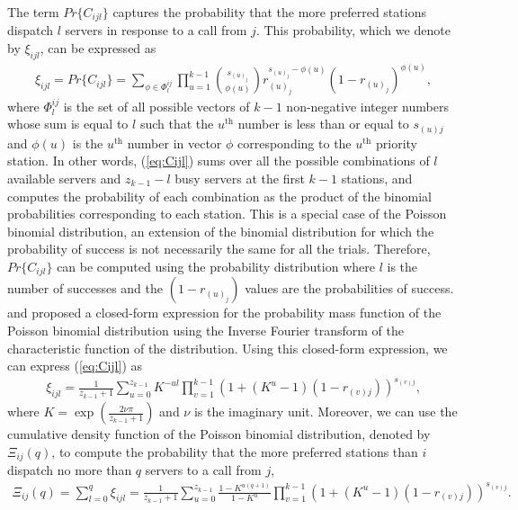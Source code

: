 \documentclass[11pt]{article}\topmargin 0mm
\begin{document}
The term $Pr\{C_{ijl}\}$ captures the probability that the more
preferred stations dispatch $l$ servers in response to a call
from $j$. This probability, which we denote by $\xi_{ijl}$, can
be expressed as
\begin{equation}
\label{eq:Cijl}
\begin{split}
\xi_{ijl} = Pr\{C_{ijl}\} = \sum_{\phi\in\Phi_{l}^{ij}} \prod_{u=1}^{k-1} {s_{(u)_j} \choose \phi(u)} r_{(u)_j}^{s_{(u)_j}-\phi(u)} (1-r_{(u)_j})^{\phi(u)},
\end{split}
\end{equation}
where $\Phi_{l}^{ij}$ is the set of all possible vectors of
$k-1$ non-negative integer numbers whose sum is equal to $l$
such that the $u^{\text{th}}$ number is less than or equal to
$s_{(u)j}$ and $\phi(u)$ is the $u^\text{th}$ number in vector
$\phi$ corresponding to the $u^\text{th}$ priority station. In
other words, (\ref{eq:Cijl}) sums over all the possible
combinations of $l$ available servers and $z_{k-1}-l$ busy
servers at the first $k-1$ stations, and computes the
probability of each combination as the product of the binomial
probabilities corresponding to each station. This is a special
case of the Poisson binomial distribution, an extension of the
binomial distribution for which the probability of success is
not necessarily the same for all the trials. Therefore,
$Pr\{C_{ijl}\}$ can be computed using the probability
distribution where $l$ is the number of successes and the
$(1-r_{(u)_j})$ values are the probabilities of success.
\citet{fernandez2010closed} and \citet{hong2011computing}
proposed a closed-form expression for the probability mass
function of the Poisson binomial distribution using the Inverse
Fourier transform of the characteristic function of the
distribution. Using this closed-form expression, we can express
(\ref{eq:Cijl}) as
\begin{equation}
\label{eq:xi_ijl}
\begin{split}
\xi_{ijl} = \frac{1}{z_{k-1}+1} \sum_{u=0}^{z_{k-1}}K^{-ul} \prod_{v=1}^{k-1} (1+(K^u-1)(1-r_{(v)j}))^{s_{(v)j}},
\end{split}
\end{equation}
where $K=\exp(\frac{2\nu\pi}{z_{k-1}+1})$ and $\nu$ is the
imaginary unit. Moreover, we can use the cumulative density
function of the Poisson binomial distribution, denoted by
$\Xi_{ij}(q)$, to compute the probability that the more
preferred stations than $i$ dispatch no more than $q$ servers
to a call from $j$,
\begin{equation}
\label{eq:Xi_ijl}
\begin{split}
\Xi_{ij}(q) = \sum_{l=0}^q \xi_{ijl} = \frac{1}{z_{k-1}+1} \sum_{u=0}^{z_{k-1}} \frac{1-K^{u(q+1)}}{1-K^u} \prod_{v=1}^{k-1} (1+(K^u-1)(1-r_{(v)j}))^{s_{(v)j}}.
\end{split}
\end{equation}
\end{document}
